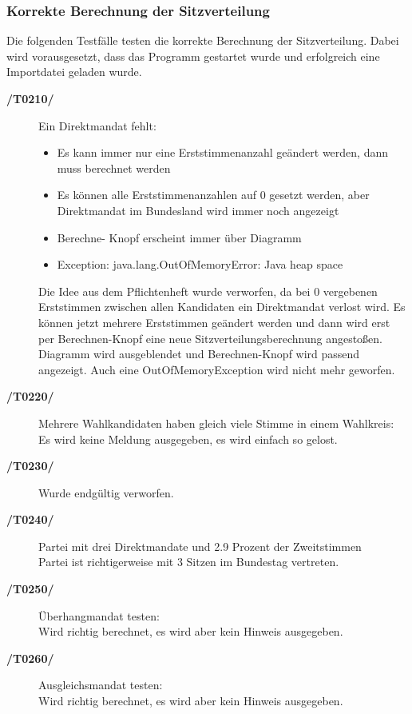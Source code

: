 \documentclass[12pt,a4paper,titlepage]{article}
\begin{document}
\subsubsection{Korrekte Berechnung der Sitzverteilung}
Die folgenden Testfälle testen die korrekte Berechnung der Sitzverteilung. Dabei wird vorausgesetzt, dass  das Programm gestartet wurde und erfolgreich eine Importdatei geladen wurde.
\begin{description}
	\item[\textbf{/T0210/}] Ein Direktmandat fehlt: \\
	\begin{itemize}
	\item Es kann immer nur eine Erststimmenanzahl geändert werden, dann muss berechnet werden
	\item Es können alle Erststimmenanzahlen auf 0 gesetzt werden, aber Direktmandat im Bundesland wird immer noch angezeigt
	\item Berechne- Knopf erscheint immer über Diagramm
	\item Exception: java.lang.OutOfMemoryError: Java heap space
	\end{itemize}
	
	Die Idee aus dem Pflichtenheft wurde verworfen, da bei 0 vergebenen Erststimmen zwischen allen Kandidaten ein Direktmandat verlost wird.
	Es können jetzt mehrere Erststimmen geändert werden und dann wird erst per Berechnen-Knopf eine neue Sitzverteilungsberechnung angestoßen.
	Diagramm wird ausgeblendet und Berechnen-Knopf wird passend angezeigt.
	Auch eine OutOfMemoryException wird nicht mehr geworfen.
	\item[\textbf{/T0220/}] Mehrere Wahlkandidaten haben gleich viele Stimme in einem Wahlkreis: \\
	Es wird keine Meldung ausgegeben, es wird einfach so gelost.
	\item[\textbf{/T0230/}] Wurde endgültig verworfen.
	\item[\textbf{/T0240/}] Partei mit drei Direktmandate und 2.9 Prozent der Zweitstimmen \\
	Partei ist richtigerweise mit 3 Sitzen im Bundestag vertreten.
	
	\item[\textbf{/T0250/}] Überhangmandat testen: \\

Wird richtig berechnet, es wird aber kein Hinweis ausgegeben.

	\item[\textbf{/T0260/}] Ausgleichsmandat testen: \\

Wird richtig berechnet, es wird aber kein Hinweis ausgegeben.
	


\end{description}
\end{document}
